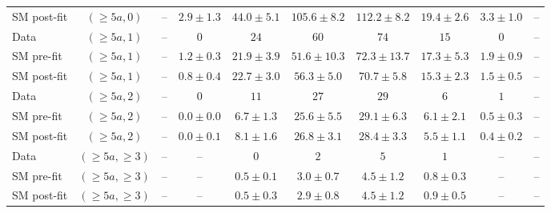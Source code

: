 \begin{table*}[h!]
{\begin{tabular}{lccccccccc}
 SM post-fit & $(\geq 5a,0)$ & -- & $2.9\pm1.3$ & $44.0\pm5.1$ & $105.6\pm8.2$ & $112.2\pm8.2$ & $19.4\pm2.6$ & $3.3\pm1.0$ & -- \\[0.5ex]
 Data & $(\geq 5a,1)$ & -- & $0$ & $24$ & $60$ & $74$ & $15$ & $0$ & -- \\[0.5ex]
 SM pre-fit & $(\geq 5a,1)$ & -- & $1.2\pm0.3$ & $21.9\pm3.9$ & $51.6\pm10.3$ & $72.3\pm13.7$ & $17.3\pm5.3$ & $1.9\pm0.9$ & -- \\[0.5ex]
 SM post-fit & $(\geq 5a,1)$ & -- & $0.8\pm0.4$ & $22.7\pm3.0$ & $56.3\pm5.0$ & $70.7\pm5.8$ & $15.3\pm2.3$ & $1.5\pm0.5$ & -- \\[0.5ex]
 Data & $(\geq 5a,2)$ & -- & $0$ & $11$ & $27$ & $29$ & $6$ & $1$ & -- \\[0.5ex]
 SM pre-fit & $(\geq 5a,2)$ & -- & $0.0\pm0.0$ & $6.7\pm1.3$ & $25.6\pm5.5$ & $29.1\pm6.3$ & $6.1\pm2.1$ & $0.5\pm0.3$ & -- \\[0.5ex]
 SM post-fit & $(\geq 5a,2)$ & -- & $0.0\pm0.1$ & $8.1\pm1.6$ & $26.8\pm3.1$ & $28.4\pm3.3$ & $5.5\pm1.1$ & $0.4\pm0.2$ & -- \\[0.5ex]
 Data & $(\geq 5a,\geq 3)$ & -- & -- & $0$ & $2$ & $5$ & $1$ & -- & -- \\[0.5ex]
 SM pre-fit & $(\geq 5a,\geq 3)$ & -- & -- & $0.5\pm0.1$ & $3.0\pm0.7$ & $4.5\pm1.2$ & $0.8\pm0.3$ & -- & -- \\[0.5ex]
 SM post-fit & $(\geq 5a,\geq 3)$ & -- & -- & $0.5\pm0.3$ & $2.9\pm0.8$ & $4.5\pm1.2$ & $0.9\pm0.5$ & -- & -- \\[0.5ex]
	\hline
	\hline
\end{tabular}}
\end{table*}
